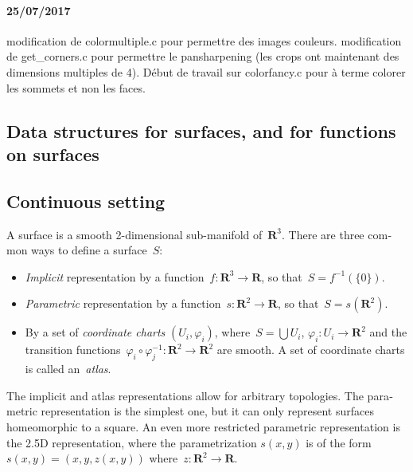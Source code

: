 \documentclass{article}
\def\R{\mathbf{R}} %
\begin{document}
\paragraph{25/07/2017}  modification de colormultiple.c pour permettre des images couleurs. modification de get\_corners.c pour permettre le pansharpening (les crops ont maintenant des dimensions multiples de 4). Début de travail sur colorfancy.c pour à terme colorer les sommets et non les faces. 
\clearpage
\begin{otherlanguage}{british}
\section{Data structures for surfaces, and for functions on surfaces}

\subsection{Continuous setting}

A surface is a smooth 2-dimensional sub-manifold of~$\R^3$.
There are three common ways to define a surface~$S$:
\begin{itemize}
	\item \emph{Implicit} representation by a function~$f:\R^3\to\R$,
		so that~$S=f^{-1}(\{0\})$.
	\item \emph{Parametric} representation by a function~$s:\R^2\to\R$,
		so that~$S=s(\R^2)$.

	\item By a set of \emph{coordinate charts} $(U_i,\varphi_i)$,
		where~$S=\bigcup U_i$, $\varphi_i:U_i\to\R^2$ and the transition
		functions~$\varphi_i\circ\varphi_j^{-1}:\R^2\to\R^2$ are
		smooth.  A set of coordinate charts is called
		an~\emph{atlas}.
\end{itemize}
The implicit and atlas representations allow for arbitrary topologies.  The
parametric representation is the simplest one, but it can only represent
surfaces homeomorphic to a square.  An even more restricted parametric
representation is the 2.5D representation, where the parametrization $s(x,y)$
is of the form~$s(x,y)=(x,y,z(x,y))$ where~$z:\R^2\to\R$.


\end{otherlanguage}
\end{document}
